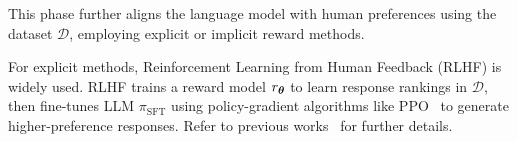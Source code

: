  
 
 


This phase further aligns the language model with human preferences using the dataset \( \mathcal{D} \), employing explicit or implicit reward methods.  

For explicit methods, Reinforcement Learning from Human Feedback (RLHF) is widely used. RLHF trains a reward model \( r_{\mathbf{{\boldsymbol{\theta}}}} \) to learn response rankings in \( \mathcal{D} \), then fine-tunes  LLM \( \pi_{\text{SFT}} \) using policy-gradient algorithms like PPO~\cite{ppo} to generate higher-preference responses. Refer to previous works~\cite{rlhfpipeline, ouyang2022training} for further details.

